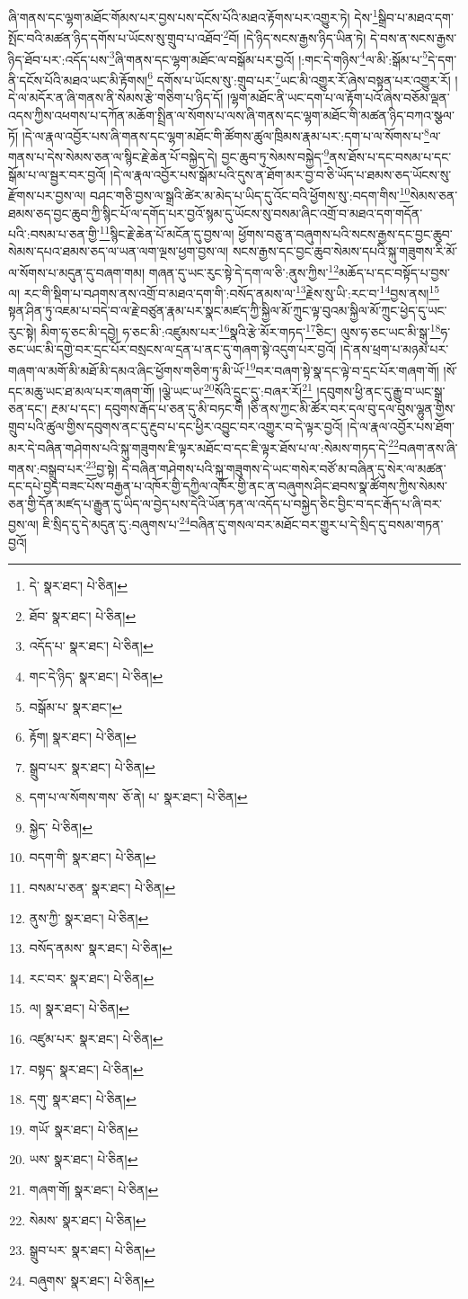 ཞི་གནས་དང་ལྷག་མཐོང་གོམས་པར་བྱས་པས་དངོས་པོའི་མཐའ་རྟོགས་པར་འགྱུར་ཏེ། དེས་\footnote{དེ་  སྣར་ཐང་།  པེ་ཅིན། }སྒྲིབ་པ་མཐའ་དག་སྤོང་བའི་མཚན་ཉིད་དགོས་པ་ཡོངས་སུ་གྲུབ་པ་འཐོབ་\footnote{ཐོབ་  སྣར་ཐང་།  པེ་ཅིན། }བོ། །དེ་ཉིད་སངས་རྒྱས་ཉིད་ཡིན་ཏེ། དེ་བས་ན་སངས་རྒྱས་ཉིད་ཐོབ་པར་:འདོད་པས་\footnote{འདོད་པ་  སྣར་ཐང་།  པེ་ཅིན། }ཞི་གནས་དང་ལྷག་མཐོང་ལ་བསྒོམ་པར་བྱའོ། །:གང་དེ་གཉིས་\footnote{གང་དེ་ཉིད་  སྣར་ཐང་།  པེ་ཅིན། }ལ་མི་:སྒོམ་པ་\footnote{བསྒོམ་པ་  སྣར་ཐང་། }དེ་དག་ནི་དངོས་པོའི་མཐའ་ཡང་མི་རྟོགས།\footnote{རྟོག།  སྣར་ཐང་།  པེ་ཅིན། } དགོས་པ་ཡོངས་སུ་:གྲུབ་པར་\footnote{སྒྲུབ་པར་  སྣར་ཐང་།  པེ་ཅིན། }ཡང་མི་འགྱུར་རོ་ཞེས་བསྟན་པར་འགྱུར་རོ། །དེ་ལ་མདོར་ན་ཞི་གནས་ནི་སེམས་རྩེ་གཅིག་པ་ཉིད་དོ། །ལྷག་མཐོང་ནི་ཡང་དག་པ་ལ་རྟོག་པའོ་ཞེས་བཅོམ་ལྡན་འདས་ཀྱིས་འཕགས་པ་དཀོན་མཆོག་སྤྲིན་ལ་སོགས་པ་ལས་ཞི་གནས་དང་ལྷག་མཐོང་གི་མཚན་ཉིད་བཀའ་སྩལ་ཏོ། །དེ་ལ་རྣལ་འབྱོར་པས་ཞི་གནས་དང་ལྷག་མཐོང་གི་ཚོགས་ཚུལ་ཁྲིམས་རྣམ་པར་:དག་པ་ལ་སོགས་པ་\footnote{དག་པ་ལ་སོགས་གས་  ཅོ་ནེ། པ་  སྣར་ཐང་།  པེ་ཅིན། }ལ་གནས་པ་དེས་སེམས་ཅན་ལ་སྙིང་རྗེ་ཆེན་པོ་བསྐྱེད་དེ། བྱང་ཆུབ་ཏུ་སེམས་བསྐྱེད་\footnote{སྐྱེད་  པེ་ཅིན། }ནས་ཐོས་པ་དང་བསམ་པ་དང་སྒོམ་པ་ལ་སྦྱར་བར་བྱའོ། །དེ་ལ་རྣལ་འབྱོར་པས་སྒོམ་པའི་དུས་ན་ཐོག་མར་བྱ་བ་ཅི་ཡོད་པ་ཐམས་ཅད་ཡོངས་སུ་རྫོགས་པར་བྱས་ལ། བཤང་གཅི་བྱས་ལ་སྒྲའི་ཚེར་མ་མེད་པ་ཡིད་དུ་འོང་བའི་ཕྱོགས་སུ་:བདག་གིས་\footnote{བདག་གི་  སྣར་ཐང་།  པེ་ཅིན། }སེམས་ཅན་ཐམས་ཅད་བྱང་ཆུབ་ཀྱི་སྙིང་པོ་ལ་དགོད་པར་བྱའོ་སྙམ་དུ་ཡོངས་སུ་བསམ་ཞིང་འགྲོ་བ་མཐའ་དག་གདོན་པའི་:བསམ་པ་ཅན་གྱི་\footnote{བསམ་པ་ཅན་  སྣར་ཐང་།  པེ་ཅིན། }སྙིང་རྗེ་ཆེན་པོ་མངོན་དུ་བྱས་ལ། ཕྱོགས་བཅུ་ན་བཞུགས་པའི་སངས་རྒྱས་དང་བྱང་ཆུབ་སེམས་དཔའ་ཐམས་ཅད་ལ་ཡན་ལག་ལྔས་ཕྱག་བྱས་ལ། སངས་རྒྱས་དང་བྱང་ཆུབ་སེམས་དཔའི་སྐུ་གཟུགས་རི་མོ་ལ་སོགས་པ་མདུན་དུ་བཞག་གམ། གཞན་དུ་ཡང་རུང་སྟེ་དེ་དག་ལ་ཅི་:ནུས་ཀྱིས་\footnote{ནུས་ཀྱི་  སྣར་ཐང་།  པེ་ཅིན། }མཆོད་པ་དང་བསྟོད་པ་བྱས་ལ། རང་གི་སྡིག་པ་བཤགས་ནས་འགྲོ་བ་མཐའ་དག་གི་:བསོད་ནམས་ལ་\footnote{བསོད་ནམས་  སྣར་ཐང་།  པེ་ཅིན། }རྗེས་སུ་ཡི་:རང་བ་\footnote{རང་བར་  སྣར་ཐང་།  པེ་ཅིན། }བྱས་ནས།\footnote{ལ།  སྣར་ཐང་།  པེ་ཅིན། } སྟན་ཤིན་ཏུ་འཇམ་པ་བདེ་བ་ལ་རྗེ་བཙུན་རྣམ་པར་སྣང་མཛད་ཀྱི་སྐྱིལ་མོ་ཀྲུང་ལྟ་བུའམ་སྐྱིལ་མོ་ཀྲུང་ཕྱེད་དུ་ཡང་རུང་སྟེ། མིག་ཧ་ཅང་མི་དབྱེ། ཧ་ཅང་མི་:འཛུམས་པར་\footnote{འཛུམ་པར་  སྣར་ཐང་།  པེ་ཅིན། }སྣའི་རྩེ་མོར་གཏད་\footnote{བསྟད་  སྣར་ཐང་།  པེ་ཅིན། }ཅིང་། ལུས་ཧ་ཅང་ཡང་མི་སྒུ་\footnote{དགུ་  སྣར་ཐང་།  པེ་ཅིན། }ཧ་ཅང་ཡང་མི་དགྱེ་བར་དྲང་པོར་བསྲངས་ལ་དྲན་པ་ནང་དུ་གཞག་སྟེ་འདུག་པར་བྱའོ། །དེ་ནས་ཕྲག་པ་མཉམ་པར་གཞག་ལ་མགོ་མི་མཐོ་མི་དམའ་ཞིང་ཕྱོགས་གཅིག་ཏུ་མི་ཡོ་\footnote{གཡོ་  སྣར་ཐང་།  པེ་ཅིན། }བར་བཞག་སྟེ་སྣ་དང་ལྟེ་བ་དྲང་པོར་གཞག་གོ། །སོ་དང་མཆུ་ཡང་ཐ་མལ་པར་གཞག་གོ། །ལྕེ་ཡང་ཡ་\footnote{ཡས་  སྣར་ཐང་།  པེ་ཅིན། }སོའི་དྲུང་དུ་:བཞར་རོ།\footnote{གཞག་གོ།  སྣར་ཐང་།  པེ་ཅིན། } །དབུགས་ཕྱི་ནང་དུ་རྒྱུ་བ་ཡང་སྒྲ་ཅན་དང་། རྔམ་པ་དང་། དབུགས་རྒོད་པ་ཅན་དུ་མི་བཏང་གི །ཅི་ནས་ཀྱང་མི་ཚོར་བར་དལ་བུ་དལ་བུས་ལྷུན་གྱིས་གྲུབ་པའི་ཚུལ་གྱིས་དབུགས་ནང་དུ་རྔུབ་པ་དང་ཕྱིར་འབྱུང་བར་འགྱུར་བ་དེ་ལྟར་བྱའོ། །དེ་ལ་རྣལ་འབྱོར་པས་ཐོག་མར་དེ་བཞིན་གཤེགས་པའི་སྐུ་གཟུགས་ཇི་ལྟར་མཐོང་བ་དང་ཇི་ལྟར་ཐོས་པ་ལ་:སེམས་གཏད་དེ་\footnote{སེམས་  སྣར་ཐང་།  པེ་ཅིན། }བཞག་ནས་ཞི་གནས་:བསྒྲུབ་པར་\footnote{སྒྲུབ་པར་  སྣར་ཐང་།  པེ་ཅིན། }བྱ་སྟེ། དེ་བཞིན་གཤེགས་པའི་སྐུ་གཟུགས་དེ་ཡང་གསེར་བཙོ་མ་བཞིན་དུ་སེར་ལ་མཚན་དང་དཔེ་བྱད་བཟང་པོས་བརྒྱན་པ་འཁོར་གྱི་དཀྱིལ་འཁོར་གྱི་ནང་ན་བཞུགས་ཤིང་ཐབས་སྣ་ཚོགས་ཀྱིས་སེམས་ཅན་གྱི་དོན་མཛད་པ་རྒྱུན་དུ་ཡིད་ལ་བྱེད་པས་དེའི་ཡོན་ཏན་ལ་འདོད་པ་བསྐྱེད་ཅིང་བྱིང་བ་དང་རྒོད་པ་ཞི་བར་བྱས་ལ། ཇི་སྲིད་དུ་དེ་མདུན་དུ་:བཞུགས་པ་\footnote{བཞུགས་  སྣར་ཐང་།  པེ་ཅིན། }བཞིན་དུ་གསལ་བར་མཐོང་བར་གྱུར་པ་དེ་སྲིད་དུ་བསམ་གཏན་བྱའོ། 